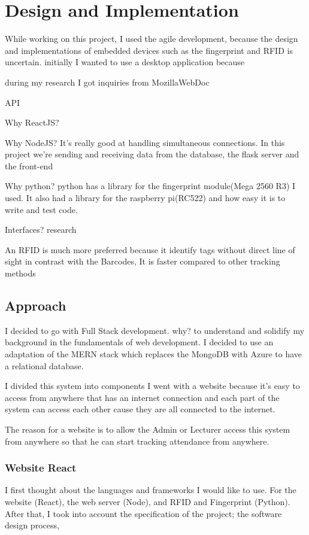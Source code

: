 \chapter{Design and Implementation}
While working on this project, I used the agile development, because the design and implementations of embedded devices such as the fingerprint and RFID is uncertain.  initially I wanted to use a desktop application because 

during my research I got inquiries from MozillaWebDoc

API


Why ReactJS?

Why NodeJS?
It's really good at handling simultaneous connections. In this project we're sending and receiving data from the database, the flask server and the front-end

Why python?
python has a library for the fingerprint module(Mega 2560 R3) I used. It also had a library for the raspberry pi(RC522) and how easy it is to write and test code.

Interfaces?
 research

An RFID is much more preferred because it identify tags without direct line of sight in contrast with the Barcodes, It is faster compared to other tracking methods 

\section{Approach}

I decided to go with Full Stack development. why? to understand and solidify my background in the fundamentals of web development. I decided to use an adaptation of the MERN stack which replaces the MongoDB with Azure to have a relational database.

I divided this system into components 
I went with a website because it's easy to access from anywhere that has an internet connection and each part of the system can access each other cause they are all connected to the internet. 

The reason for a website is to allow the Admin or Lecturer access this system from anywhere so that he can start tracking attendance from anywhere.

\subsection{Website React}
I first thought about the languages and frameworks I would like to use. For the website (React), the web server (Node), and RFID and Fingerprint (Python). After that, I took into account the specification of the project; the software design process, 

